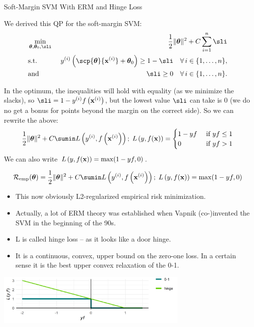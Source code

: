 \documentclass[11pt,compress,t,notes=noshow, xcolor=table]{beamer}
\begin{document}
\begin{vbframe}{Soft-Margin SVM With ERM and Hinge Loss}

We derived this QP for the soft-margin SVM: 
  \begin{eqnarray*}
    & \min\limits_{\thetav, \thetav_0,\sli} & \frac{1}{2} \|\thetav\|^2 + C   \sum_{i=1}^n \sli \\
    & \text{s.t.} & \,\, \yi  \left( \scp{\thetav}{\xi} + \thetav_0 \right) \geq 1 - \sli \quad \forall\, i \in \nset,\\
    & \text{and} & \,\, \sli \geq 0 \quad \forall\, i \in \nset.
  \end{eqnarray*}

  In the optimum, the inequalities will hold with equality (as we minimize the slacks), so $\sli = 1 - \yi \fxi$, but the lowest value $\sli$ can take is 0 (we do no get a bonus for points beyond the margin on the correct side).
  So we can rewrite the above: 
\begin{align*} 
    \frac{1}{2} \|\thetav\|^2 + C \sumin \Lxyi ;\; \Lxy = 
    \begin{cases} 
      1 - y f & \text{ if } y f \leq 1 \\ 
      0       & \text{ if } y f > 1 
    \end{cases}
\end{align*} 
We can also write $L\left(y, f(\mathbf{x})\right) = \max(1-yf, 0)$.

\framebreak
  $$ \risket = \frac{1}{2} \|\thetav\|^2 + C \sumin \Lxyi ;\; \Lxy = \max(1-yf, 0)$$
  \begin{itemize}
    \item This now obviously L2-regularized empirical risk minimization.
    \item Actually, a lot of ERM theory was established when Vapnik (co-)invented the SVM in the beginning of the 90s.
    \item L is called hinge loss -- as it looks like a door hinge.
    \item It is a continuous, convex, upper bound on the zero-one loss.
      In a certain sense it is the best upper convex relaxation of the 0-1.
  \end{itemize}


\begin{center}
\includegraphics[width = 0.7\textwidth]{figure/soft_margin_losses.png} \\
\end{center}


\end{vbframe}
\end{document}
